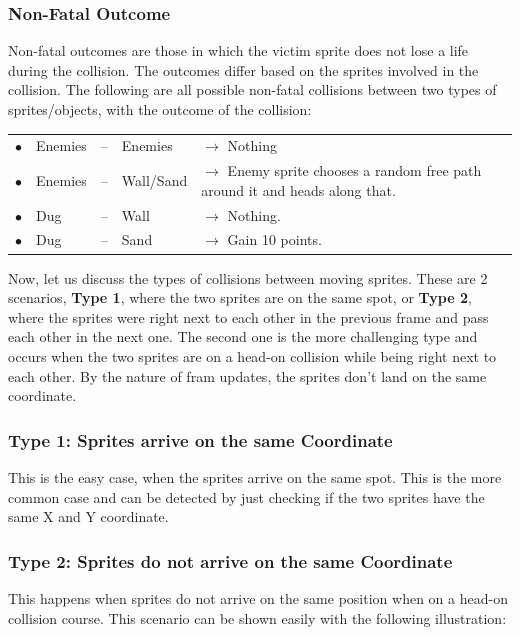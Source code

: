     \subsubsection*{Non-Fatal Outcome}

    Non-fatal outcomes are those in which the victim sprite does not lose a life during the collision. The outcomes differ based on the sprites involved in the collision.
    The following are all possible non-fatal collisions between two types of sprites/objects, with the outcome of the collision:

    \begin{tabular}{clcll}
      $\bullet$ & Enemies   & -- &  Enemies &	$\rightarrow$ Nothing\\
      $\bullet$ & Enemies   & -- &  Wall/Sand &	$\rightarrow$ Enemy sprite chooses a random free path around it and heads along that.\\
      $\bullet$ & Dug   & -- &  Wall &	$\rightarrow$ Nothing.\\
      $\bullet$ & Dug   & -- & Sand &	$\rightarrow$ Gain 10 points.\\
    \end{tabular}


  Now, let us discuss the types of collisions between moving sprites. These are 2 scenarios, \textbf{Type 1}, where the two sprites are on the same spot, or \textbf{Type 2}, where the sprites were right next to each other in the previous frame and pass each other in the next one. The second one is the more challenging type and occurs when the two sprites are on a head-on collision while being right next to each other. By the nature of fram updates, the sprites don't land on the same coordinate.

  \subsubsection*{Type 1: Sprites arrive on the same Coordinate}

  This is the easy case, when the sprites arrive on the same spot. This is the more common case and can be detected by just checking if the two sprites have the same X and Y coordinate.

  \subsubsection*{Type 2: Sprites do not arrive on the same Coordinate}

  This happens when sprites do not arrive on the same position when on a head-on collision course. This scenario can be shown easily with the following illustration:

